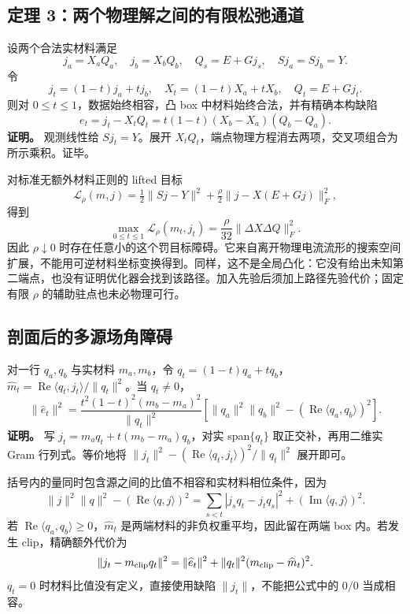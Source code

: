 \documentclass[10pt,a4paper]{article}
\begin{document}
\hypertarget{ux5b9aux7406-3ux4e24ux4e2aux7269ux7406ux89e3ux4e4bux95f4ux7684ux6709ux9650ux677eux5f1bux901aux9053}{%
\subsection{定理
3：两个物理解之间的有限松弛通道}\label{ux5b9aux7406-3ux4e24ux4e2aux7269ux7406ux89e3ux4e4bux95f4ux7684ux6709ux9650ux677eux5f1bux901aux9053}}

设两个合法实材料满足
\[j_a=X_aQ_a,\quad j_b=X_bQ_b,\quad Q_s=E+Gj_s,\quad Sj_a=Sj_b=Y.\] 令
\[j_t=(1-t)j_a+t j_b,\quad X_t=(1-t)X_a+tX_b,\quad Q_t=E+Gj_t.\] 则对
\(0\le t\le1\)，数据始终相容，凸 box 中材料始终合法，并有精确本构缺陷
\[\boxed{e_t=j_t-X_tQ_t=t(1-t)(X_b-X_a)(Q_b-Q_a).}\] \textbf{证明。}
观测线性给 \(Sj_t=Y\)。展开
\(X_tQ_t\)，端点物理方程消去两项，交叉项组合为所示乘积。证毕。

对标准无额外材料正则的 lifted 目标
\[\mathcal L_\rho(m,j)=\tfrac12\|Sj-Y\|^2+\tfrac\rho2\|j-X(E+Gj)\|_F^2,\]
得到 \[\boxed{\max_{0\le t\le1}\mathcal L_\rho(m_t,j_t)
=\frac\rho{32}\|\Delta X\Delta Q\|_F^2.}\] 因此 \(\rho\downarrow0\)
时存在任意小的这个罚目标障碍。它来自离开物理电流流形的搜索空间扩展，不能用可逆材料坐标变换得到。同样，这不是全局凸化：它没有给出未知第二端点，也没有证明优化器会找到该路径。加入先验后须加上路径先验代价；固定有限
\(\rho\) 的辅助驻点也未必物理可行。

\hypertarget{ux5256ux9762ux540eux7684ux591aux6e90ux573aux89d2ux969cux788d}{%
\subsection{剖面后的多源场角障碍}\label{ux5256ux9762ux540eux7684ux591aux6e90ux573aux89d2ux969cux788d}}

对一行 \(q_a,q_b\) 与实材料 \(m_a,m_b\)，令
\(q_t=(1-t)q_a+tq_b\)，\(\widehat m_t=\operatorname{Re}\langle q_t,j_t\rangle/\|q_t\|^2\)。当
\(q_t\ne0\)， \[\boxed{\|\widehat e_t\|^2=
\frac{t^2(1-t)^2(m_b-m_a)^2}{\|q_t\|^2}
\left[\|q_a\|^2\|q_b\|^2-(\operatorname{Re}\langle q_a,q_b\rangle)^2\right].}\]
\textbf{证明。} 写 \(j_t=m_aq_t+t(m_b-m_a)q_b\)，对实 span\(\{q_t\}\)
取正交补，再用二维实 Gram 行列式。等价地将
\(\|j_t\|^2-(\operatorname{Re}\langle q_t,j_t\rangle)^2/\|q_t\|^2\)
展开即可。

括号内的量同时包含源之间的比值不相容和实材料相位条件，因为
\[\|j\|^2\|q\|^2-(\operatorname{Re}\langle q,j\rangle)^2
=\sum_{s<t}|j_sq_t-j_tq_s|^2+(\operatorname{Im}\langle q,j\rangle)^2.\]
若 \(\operatorname{Re}\langle q_a,q_b\rangle\ge0\)，\(\widehat m_t\)
是两端材料的非负权重平均，因此留在两端 box 内。若发生
clip，精确额外代价为 \[\|j_t-m_{\rm clip}q_t\|^2
=\|\widehat e_t\|^2+\|q_t\|^2(m_{\rm clip}-\widehat m_t)^2.\] \(q_t=0\)
时材料比值没有定义，直接使用缺陷 \(\|j_t\|\)，不能把公式中的 \(0/0\)
当成相容。
\end{document}
